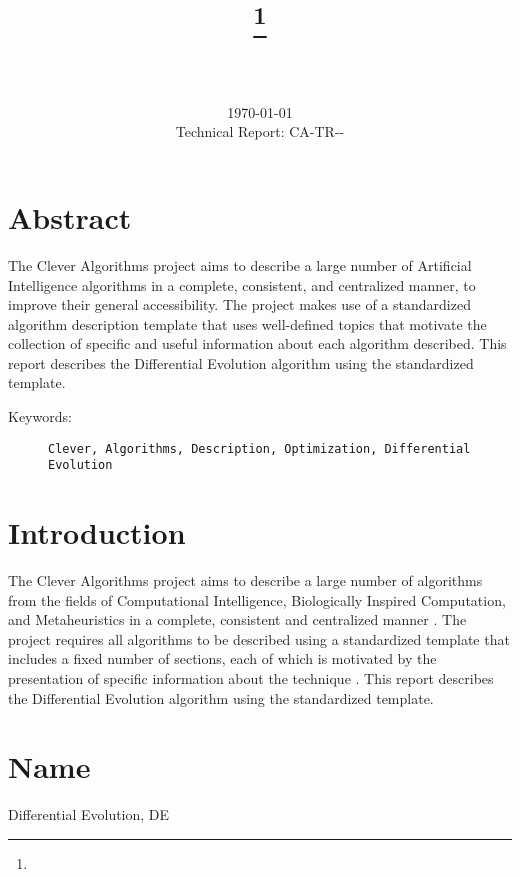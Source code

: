 \documentclass[a4paper, 11pt]{article}
\title{{\myreporttitle}\footnote{\myreportlicense}}
\author{\myreportauthor\\{\myreportemail}\\\small\myreportproject}
\date{\today\\{\small{Technical Report: CA-TR-{\myreportdate}-\myreportversion}}}
\begin{document}
\maketitle

\section*{Abstract} 
The Clever Algorithms project aims to describe a large number of Artificial Intelligence algorithms in a complete, consistent, and centralized manner, to improve their general accessibility. 
The project makes use of a standardized algorithm description template that uses well-defined topics that motivate the collection of specific and useful information about each algorithm described.
This report describes the Differential Evolution algorithm using the standardized template.

\begin{description}
	\item[Keywords:] {\small\texttt{Clever, Algorithms, Description, Optimization, Differential Evolution}}
\end{description} 

\section{Introduction} 
\label{sec:intro}
The Clever Algorithms project aims to describe a large number of algorithms from the fields of Computational Intelligence, Biologically Inspired Computation, and Metaheuristics in a complete, consistent and centralized manner \cite{Brownlee2010}.
The project requires all algorithms to be described using a standardized template that includes a fixed number of sections, each of which is motivated by the presentation of specific information about the technique \cite{Brownlee2010a}.
This report describes the Differential Evolution algorithm using the standardized template.

\section{Name} 
\label{sec:name}
Differential Evolution, DE
\end{document}
